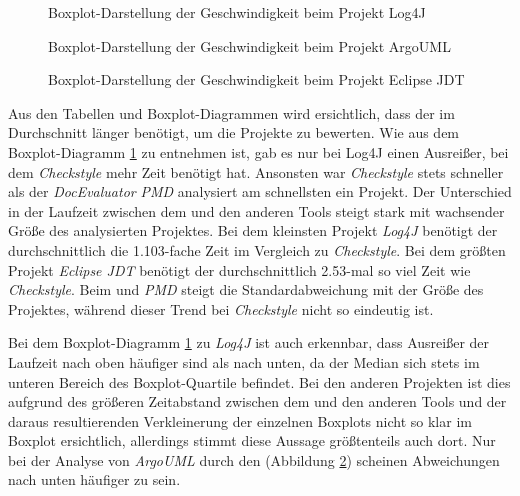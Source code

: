  
 \begin{figure}
    \centering

    \caption{Boxplot-Darstellung der Geschwindigkeit beim Projekt Log4J}
    \label{fig:log4j_box}
\end{figure}

 \begin{figure}
    \centering

    \caption{Boxplot-Darstellung der Geschwindigkeit beim Projekt ArgoUML}
    \label{fig:argo_box}
\end{figure}

 \begin{figure}
    \centering

    \caption{Boxplot-Darstellung der Geschwindigkeit beim Projekt Eclipse JDT }
    \label{fig:eclipse_box}
\end{figure}

Aus den Tabellen und Boxplot-Diagrammen wird ersichtlich, dass der \doceval im Durchschnitt länger benötigt, um die Projekte zu bewerten. Wie aus dem Boxplot-Diagramm \ref{fig:log4j_box} zu entnehmen ist, gab es nur bei Log4J einen Ausreißer, bei dem \textit{Checkstyle} mehr Zeit benötigt hat.   Ansonsten war \textit{Checkstyle} stets schneller als der \textit{DocEvaluator} \textit{PMD} analysiert am schnellsten ein Projekt. Der Unterschied in der Laufzeit zwischen dem \doceval und den anderen Tools steigt stark  mit wachsender Größe des analysierten Projektes.  Bei dem kleinsten Projekt \textit{Log4J} benötigt der \doceval  durchschnittlich die 1.103-fache Zeit im Vergleich zu \textit{Checkstyle}. Bei dem größten Projekt \textit{Eclipse JDT} benötigt der \doceval durchschnittlich 2.53-mal so viel Zeit wie \textit{Checkstyle}. Beim \doceval und \textit{PMD} steigt die Standardabweichung mit der Größe des Projektes, während dieser Trend bei \textit{Checkstyle} nicht so eindeutig ist.

Bei dem Boxplot-Diagramm \ref{fig:log4j_box} zu \textit{Log4J} ist auch erkennbar, dass Ausreißer der Laufzeit nach oben häufiger sind als nach unten, da der Median sich stets im unteren Bereich des Boxplot-Quartile befindet. Bei den anderen Projekten ist dies aufgrund des größeren Zeitabstand  zwischen dem \doceval und den anderen Tools  und der daraus resultierenden Verkleinerung der einzelnen Boxplots  nicht so klar im Boxplot ersichtlich, allerdings stimmt diese Aussage größtenteils auch dort. Nur bei der Analyse von \textit{ArgoUML} durch den \doceval (Abbildung \ref{fig:argo_box}) scheinen Abweichungen nach unten häufiger zu sein.


